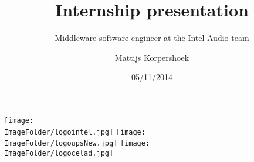 %
%

\title{Internship presentation}
\subtitle{Middleware software engineer at the Intel Audio team}
\author{Mattijs Korpershoek}
\date{05/11/2014}

\begin{frame}
  \maketitle
{
    \texttt{[image: \\ImageFolder/logointel.jpg]}\hfill
    \texttt{[image: \\ImageFolder/logoupsNew.jpg]}
    \hfill \texttt{[image: \\ImageFolder/logocelad.jpg]}
}
\end{frame}
